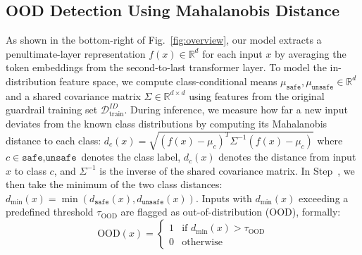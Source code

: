 \subsection{OOD Detection Using Mahalanobis Distance}
\label{sec:ood_detection}
As shown in the bottom-right of Fig.~\ref{fig:overview}, our model extracts a penultimate-layer representation $f(x) \in \mathbb{R}^d$ for each input $x$ by averaging the token embeddings from the second-to-last transformer layer. To model the in-distribution feature space, we compute class-conditional means $\mu_{\texttt{safe}}, \mu_{\texttt{unsafe}} \in \mathbb{R}^d$ and a shared covariance matrix $\Sigma \in \mathbb{R}^{d \times d}$ using features from the original guardrail training set $\mathcal{D}_{\text{train}}^{ID}$. During inference, we measure how far a new input deviates from the known class distributions by computing its Mahalanobis distance to each class: $d_c(x) = \sqrt{(f(x) - \mu_c)^T \Sigma^{-1} (f(x) - \mu_c)}$
where $c \in {\texttt{safe}, \texttt{unsafe}}$ denotes the class label,
$d_c(x)$ denotes the distance from input $x$ to class $c$,
and $\Sigma^{-1}$ is the inverse of the shared covariance matrix.
In Step~, we then take the minimum of the two class distances: $d_{\text{min}}(x) = \min(d_{\texttt{safe}}(x), d_{\texttt{unsafe}}(x))$.
Inputs with $d_{\text{min}}(x)$ exceeding a predefined threshold $\tau_{\text{OOD}}$ are flagged as out-of-distribution (OOD), formally:
$$
\text{OOD}(x) = 
\begin{cases}
1 & \text{if } d_{\text{min}}(x) > \tau_{\text{OOD}} \\
0 & \text{otherwise}
\end{cases}
$$



